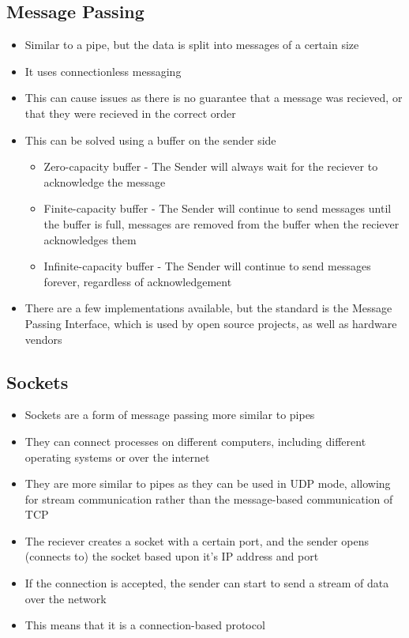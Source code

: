 \subsection*{Message Passing}

\begin{itemize}
  \item Similar to a pipe, but the data is split into messages of a certain size
  \item It uses connectionless messaging
  \item This can cause issues as there is no guarantee that a message was recieved, or that they were recieved in the correct order
  \item This can be solved using a buffer on the sender side
  \begin{itemize}
    \item Zero-capacity buffer - The Sender will always wait for the reciever to acknowledge the message
    \item Finite-capacity buffer - The Sender will continue to send messages until the buffer is full, messages are removed from the buffer when the reciever acknowledges them
    \item Infinite-capacity buffer - The Sender will continue to send messages forever, regardless of acknowledgement
  \end{itemize}
  \item There are a few implementations available, but the standard is the Message Passing Interface, which is used by open source projects, as well as hardware vendors
\end{itemize}

\subsection*{Sockets}

\begin{itemize}
  \item Sockets are a form of message passing more similar to pipes
  \item They can connect processes on different computers, including different operating systems or over the internet
  \item They are more similar to pipes as they can be used in UDP mode, allowing for stream communication rather than the message-based communication of TCP
  \item The reciever creates a socket with a certain port, and the sender opens (connects to) the socket based upon it's IP address and port
  \item If the connection is accepted, the sender can start to send a stream of data over the network
  \item This means that it is a connection-based protocol
\end{itemize}


